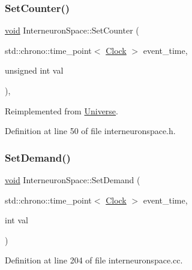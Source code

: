 \subsubsection{\texorpdfstring{Set\+Counter()}{SetCounter()}}
{\footnotesize\ttfamily \mbox{\hyperlink{glad_8h_a950fc91edb4504f62f1c577bf4727c29}{void}} Interneuron\+Space\+::\+Set\+Counter (\begin{DoxyParamCaption}\item[{std\+::chrono\+::time\+\_\+point$<$ \mbox{\hyperlink{universe_8h_a0ef8d951d1ca5ab3cfaf7ab4c7a6fd80}{Clock}} $>$}]{event\+\_\+time,  }\item[{unsigned int}]{val }\end{DoxyParamCaption})\hspace{0.3cm}{\ttfamily [inline]}, {\ttfamily [virtual]}}



Reimplemented from \mbox{\hyperlink{class_universe_aa22202ae740eb1355529afcb13285e91}{Universe}}.



Definition at line 50 of file interneuronspace.\+h.

\mbox{\label{class_interneuron_space_ad2225077a049e78ce583a79eee2d373f}} 
\subsubsection{\texorpdfstring{Set\+Demand()}{SetDemand()}}
{\footnotesize\ttfamily \mbox{\hyperlink{glad_8h_a950fc91edb4504f62f1c577bf4727c29}{void}} Interneuron\+Space\+::\+Set\+Demand (\begin{DoxyParamCaption}\item[{std\+::chrono\+::time\+\_\+point$<$ \mbox{\hyperlink{universe_8h_a0ef8d951d1ca5ab3cfaf7ab4c7a6fd80}{Clock}} $>$}]{event\+\_\+time,  }\item[{int}]{val }\end{DoxyParamCaption})}



Definition at line 204 of file interneuronspace.\+cc.

\mbox{\label{class_interneuron_space_a7fc404aae98d45ccad26b5c186fab6e2}} 
